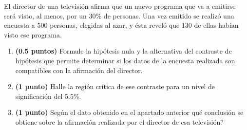 
El director de una televisión afirma que un nuevo programa que va a emitirse será visto, al menos, por un 30\% de personas. Una vez emitido se realizó una encuesta a 500 personas, elegidas al azar, y ésta reveló que 130 de ellas habían visto ese programa.
\begin{enumerate}[label=\alph*)]
\item \textbf{(0.5 puntos)} Formule la hipótesis nula y la alternativa del contraste de hipótesis que permite determinar si los datos de la encuesta realizada son compatibles con la afirmación del director.
\item \textbf{(1 punto)} Halle la región crítica de ese contraste para un nivel de significación del 5.5\%.
\item \textbf{(1 punto)} Según el dato obtenido en el apartado anterior \textquestiondown{}qué conclusión se obtiene sobre la afirmación realizada por el director de esa televisión?
\end{enumerate}
